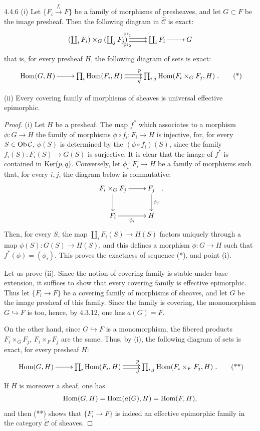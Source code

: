 \begin{lemma}{4.4.6}\label{IV.4.4.6}
(i) Let \(\{F_i\xrightarrow{f_i}F\}\) be a family of morphisms
of presheaves, and let \(G\subset F\) be the image presheaf.
Then the following diagram in \(\widehat{\mathcal C}\) is exact:
\[
\xymatrix{
(\coprod_i F_i)\times_G(\coprod_j F_j)
\ar@<.5ex>[r]^{\mathrm{pr}_1}\ar@<-.5ex>[r]_{\mathrm{pr}_2}
 & \coprod_i F_i\ar[r] & G }
\]
that is, for every presheaf \(H\), the following diagram of sets is exact:
\[
\xymatrix{
\Hom(G,H)\ar[r] & \prod_i\Hom(F_i,H)
\ar@<.5ex>[r]^p\ar@<-.5ex>[r]_q
 & \prod_{i,j}\Hom(F_i\times_G F_j,H) }.\tag{*}
\]

(ii) Every covering family of morphisms of sheaves is universal
effective epimorphic.
\end{lemma}
\begin{proof}
(i) Let \(H\) be a presheaf.
The map \(f^*\) which associates to a morphism \(\phi:G\to H\)
the family of morphisms \(\phi\circ f_i:F_i\to H\) is injective,
for, for every \(S\in\operatorname{Ob}\mathcal C\), \(\phi(S)\) is determined
by the \((\phi\circ f_i)(S)\), since the family
\(f_i(S):F_i(S)\to G(S)\) is surjective.
It is clear that the image of \(f^*\) is contained in \(\operatorname{Ker}(p,q)\).
Conversely, let \(\phi_i:F_i\to H\) be a family of morphisms
such that, for every \(i,j\), the diagram below is commutative:
\[
\xymatrix{F_i\times_G F_j\ar[r]\ar[d] & F_j\ar[d]^{\phi_j}\\
F_i\ar[r]_{\phi_i} & H }.
\]
Then, for every \(S\), the map \(\coprod_i F_i(S)\to H(S)\)
factors uniquely through a map \(\phi(S):G(S)\to H(S)\),
and this defines a morphism \(\phi:G\to H\) such that
\(f^*(\phi)=(\phi_i)\). This proves the exactness of sequence
(*), and point (i).

Let us prove (ii). Since the notion of covering family is stable
under base extension, it suffices to show that every covering
family is effective epimorphic. Thus let \(\{F_i\to F\}\) be a
covering family of morphisms of sheaves, and let \(G\) be the
image presheaf of this family. Since the family is covering,
the monomorphism \(G\hookrightarrow F\) is too, hence, by
4.3.12, one has \(a(G)=F\).

On the other hand, since \(G\hookrightarrow F\) is a monomorphism,
the fibered products \(F_i\times_G F_j\), \(F_i\times_F F_j\)
are the same. Thus, by (i), the following diagram of sets is exact,
for every presheaf \(H\):
\[
\xymatrix{
\Hom(G,H)\ar[r] & \prod_i\Hom(F_i,H)
\ar@<.5ex>[r]^p\ar@<-.5ex>[r]_q
 & \prod_{i,j}\Hom(F_i\times_F F_j,H) }.\tag{**}
\]
If \(H\) is moreover a sheaf, one has
\[
\operatorname{Hom}(G,H)=\operatorname{Hom}(a(G),H)=\operatorname{Hom}(F,H),
\]
and then (**) shows that \(\{F_i\to F\}\) is indeed an effective
epimorphic family in the category \(\widetilde{\mathcal C}\)
of sheaves.
\end{proof}

